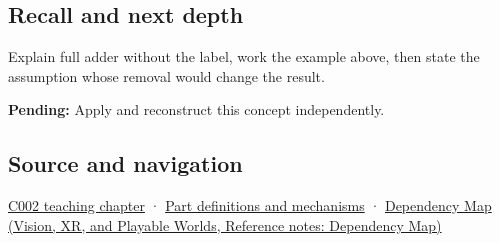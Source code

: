 \subsection{Recall and next depth}\label{appendix-d1a5b1e520c2-recall-and-next-depth}

Explain full adder without the label, work the example above, then state the assumption whose removal would change the result.

\textbf{Pending:} Apply and reconstruct this concept independently.

\subsection{Source and navigation}\label{appendix-d1a5b1e520c2-source-and-navigation}

\hyperref[01-foundations-i-ch001-arithmetic-becomes-a-policy]{C002 teaching chapter} · \hyperref[appendix-fd090d982a15]{Part definitions and mechanisms} · \href{../07-Vision-XR-and-Playable-Worlds/main.pdf\#nameddest=appendix-4ad47bdd269a}{Dependency Map (Vision, XR, and Playable Worlds, Reference notes: Dependency Map)}

